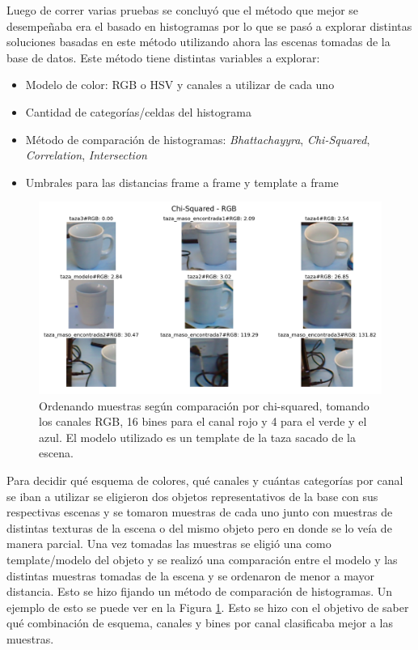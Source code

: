 Luego de correr varias pruebas se concluyó que el método que mejor se desempeñaba era el basado en histogramas por lo que se pasó a explorar distintas soluciones basadas en este método utilizando ahora las escenas tomadas de la base de datos. Este método tiene distintas variables a explorar:
\begin{itemize}
	\item Modelo de color: RGB o HSV y canales a utilizar de cada uno
	\item Cantidad de categorías/celdas del histograma
	\item Método de comparación de histogramas: \textit{Bhattachayyra}, \textit{Chi-Squared}, \textit{Correlation}, \textit{Intersection}
	\item Umbrales para las distancias frame a frame y template a frame
\end{itemize}


\begin{figure}
	\centering
	\includegraphics[width=\textwidth]{img/results_chi-squared_rgb_16r_4g_4b.png}
	\caption{Ordenando muestras según comparación por chi-squared, tomando los canales RGB, 16 bines para el canal rojo y 4 para el verde y el azul. El modelo utilizado es un template de la taza sacado de la escena.}
	\label{pruebas_eleccion_canales}
\end{figure}

Para decidir qué esquema de colores, qué canales y cuántas categorías por canal se iban a utilizar se eligieron dos objetos representativos de la base con sus respectivas escenas y se tomaron muestras de cada uno junto con muestras de distintas texturas de la escena o del mismo objeto pero en donde se lo veía de manera parcial. Una vez tomadas las muestras se eligió una como template/modelo del objeto y se realizó una comparación entre el modelo y las distintas muestras tomadas de la escena y se ordenaron de menor a mayor distancia. Esto se hizo fijando un método de comparación de histogramas. Un ejemplo de esto se puede ver en la Figura \ref{pruebas_eleccion_canales}. Esto se hizo con el objetivo de saber qué combinación de esquema, canales y bines por canal clasificaba mejor a las muestras.

